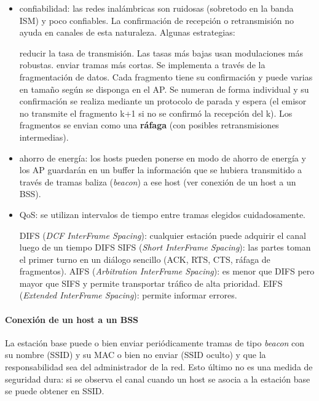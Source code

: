 \documentclass{book}
\begin{document}
	\begin{itemize}
		\item confiabilidad: las redes inalámbricas son ruidosas (sobretodo en la banda ISM) y poco confiables. La confirmación de recepción o retransmisión no ayuda en canales de esta naturaleza. Algunas estrategias:
		
		\subitem * reducir la tasa de transmisión. Las tasas más bajas usan modulaciones más robustas.
		\subitem * enviar tramas más cortas. Se implementa a través de la fragmentación de datos. Cada fragmento tiene su confirmación y puede varias en tamaño según se disponga en el AP. Se numeran de forma individual y su confirmación se realiza mediante un protocolo de parada y espera (el emisor no transmite el fragmento k+1 si no se confirmó la recepción del k). Los fragmentos se envian como una \textbf{ráfaga} (con posibles retransmisiones intermedias).
		
		\item ahorro de energía: los hosts pueden ponerse en modo de ahorro de energía y los AP guardarán en un buffer la información que se hubiera transmitido a través de tramas baliza (\textit{beacon}) a ese host (ver conexión de un host a un BSS).
		
		\item QoS: se utilizan intervalos de tiempo entre tramas elegidos cuidadosamente.
		
		\subitem* DIFS (\textit{DCF InterFrame Spacing}): cualquier estación puede adquirir el canal luego de un tiempo DIFS
		\subitem* SIFS (\textit{Short InterFrame Spacing}): las partes toman el primer turno en un diálogo sencillo (ACK, RTS, CTS, ráfaga de fragmentos).
		\subitem* AIFS (\textit{Arbitration InterFrame Spacing}): es menor que DIFS pero mayor que SIFS y permite transportar tráfico de alta prioridad.
		\subitem* EIFS (\textit{Extended InterFrame Spacing}): permite informar errores.
		
	\end{itemize}
	
	\paragraph{Conexión de un host a un BSS}
	La estación base puede o bien enviar periódicamente tramas de tipo \textit{beacon} con su nombre (SSID) y su MAC o bien no enviar (SSID oculto) y que la responsabilidad sea del administrador de la red. Esto último no es una medida de seguridad dura: si se observa el canal cuando un host se asocia a la estación base se puede obtener en SSID.
	
\end{document}
